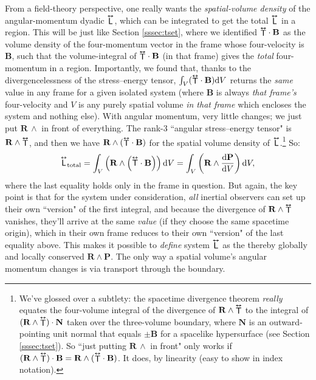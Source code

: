 \documentclass[12pt]{article}
\renewcommand{\vv}[1]{\mathbf{#1}}
\newcommand{\dd}[1]{\mathrm{d}#1}
\newcommand{\tightoverset}[2]{%
  \mathop{#2}\limits^{\vbox to -.5ex{\kern-0.75ex\hbox{$#1$}\vss}}}
\newcommand{\inlinedy}[1]{\tightoverset{\text{\tiny$\bm\leftrightarrow$}}{#1}}
\newcommand{\fnoverset}[2]{%
  \mathop{#2}\limits^{\vbox to -.5ex{\kern-0.85ex\hbox{$#1$}\vss}}}
\newcommand{\footnotedy}[1]{\fnoverset{\text{\tiny$\bm\leftrightarrow$}}{#1}}
\newcommand{\capdy}[1]{ \overset{ \text{\tiny$\bm\leftrightarrow$} }{\vphantom{\text{\small{A}}}\smash{#1}} }
\begin{document}
From a field-theory perspective, one really wants the \emph{spatial-volume density} of the angular-momentum dyadic $\inlinedy{\mathsf{L}}$, which can be integrated to get the total $\inlinedy{\mathsf{L}}$ in a region. This will be just like Section \ref{sssec:tset}, where we identified ${\inlinedy{\mathsf{T}}} \cdot \vv B$ as the volume density of the four-momentum vector in the frame whose four-velocity is $\vv B$, such that the volume-integral of ${\inlinedy{\mathsf{T}}} \cdot \vv B$ (in that frame) gives the \emph{total} four-momentum in a region. Importantly, we found that, thanks to the divergencelessness of the stress--energy tensor, $\int_V ({\inlinedy{\mathsf{T}}} \cdot \vv B) \dd V$ returns the \emph{same} value in any frame for a given isolated system (where $\vv B$ is always \emph{that frame's} four-velocity and $V$ is any purely spatial volume \emph{in that frame} which encloses the system and nothing else). With angular momentum, very little changes; we just put $\vv R \, \wedge$ in front of everything. The rank-3 ``angular stress--energy tensor" is $\vv R \wedge {\inlinedy{\mathsf{T}}}$, and then we have $\vv R \wedge ({\inlinedy{\mathsf{T}}} \cdot \vv B)$ for the spatial volume density of $\inlinedy{\mathsf{L}}$.\footnote{We've glossed over a subtlety: the spacetime divergence theorem \emph{really} equates the four-volume integral of the divergence of $\vv R \wedge {\footnotedy{\mathsf{T}}}$ to the integral of $(\vv R \wedge {\footnotedy{\mathsf{T}}}) \cdot \vv N$ taken over the three-volume boundary, where $\vv N$ is an outward-pointing unit normal that equals $\pm \vv B$ for a spacelike hypersurface (see Section \ref{sssec:tset}). So ``just putting $\vv R \, \wedge$ in front" only works if $(\vv R \wedge {\footnotedy{\mathsf{T}}}) \cdot \vv B = \vv R \wedge ({\footnotedy{\mathsf{T}}} \cdot \vv B)$. It does, by linearity (easy to show in index notation).} So:
\begin{equation*}
\capdy{\mathsf{L}}_{\textrm{total}} = \int_V \left( \vv R \wedge \left( {\capdy{\mathsf{T}}} \cdot \vv B \right) \right) \dd V = \int_V \left( \vv R \wedge \dfrac{\dd \vv P}{\dd V} \right) \dd V,
\end{equation*}
where the last equality holds only in the frame in question. But again, the key point is that for the system under consideration, \emph{all} inertial observers can set up their own ``version" of the first integral, and because the divergence of $\vv R \wedge {\inlinedy{\mathsf{T}}}$ vanishes, they'll arrive at the same \emph{value} (if they choose the same spacetime origin), which in their own frame reduces to their own ``version" of the last equality above. This makes it possible to \emph{define} system $\inlinedy{\mathsf{L}}$ as the thereby globally and locally conserved $\vv R \wedge \vv P$. The only way a spatial volume's angular momentum changes is via transport through the boundary.
\end{document}
